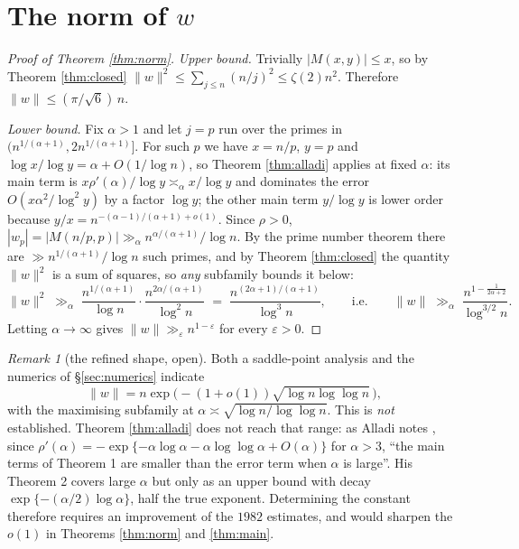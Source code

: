 \documentclass[11pt]{article}
\theoremstyle{definition}
\theoremstyle{remark}
\newtheorem{remark}[theorem]{Remark}
\begin{document}
\section{The norm of \texorpdfstring{$w$}{w}}\label{sec:norm}

\begin{proof}[Proof of Theorem \ref{thm:norm}]
\emph{Upper bound.} Trivially $|M(x,y)|\le x$, so by Theorem \ref{thm:closed}
$\|w\|^2\le\sum_{j\le n}(n/j)^2\le\zeta(2)n^2$. Therefore
$\|w\|\le (\pi/\sqrt6)\,n$.

\emph{Lower bound.} Fix $\alpha>1$ and let $j=p$ run over the primes in
$(n^{1/(\alpha+1)},2n^{1/(\alpha+1)}]$. For such $p$ we have $x=n/p$, $y=p$ and
$\log x/\log y=\alpha+O(1/\log n)$, so Theorem \ref{thm:alladi} applies at fixed
$\alpha$: its main term is $x\rho'(\alpha)/\log y\asymp_\alpha x/\log y$ and
dominates the error $O(x\alpha^2/\log^2 y)$ by a factor $\log y$; the other
main term $y/\log y$ is lower order because
$y/x=n^{-(\alpha-1)/(\alpha+1)+o(1)}$. Since
$\rho>0$, $|w_p| = |M(n/p,p)| \gg_\alpha n^{\alpha/(\alpha+1)}/\log n$. By the
prime number theorem there are $\gg n^{1/(\alpha+1)}/\log n$ such primes, and by
Theorem \ref{thm:closed} the quantity $\|w\|^2$ is a sum of squares, so
\emph{any} subfamily bounds it below:
\[
  \|w\|^2 \;\gg_\alpha\; \frac{n^{1/(\alpha+1)}}{\log n}\cdot
  \frac{n^{2\alpha/(\alpha+1)}}{\log^2 n}
  \;=\;\frac{n^{(2\alpha+1)/(\alpha+1)}}{\log^3 n},
  \qquad\text{i.e.}\qquad
  \|w\| \;\gg_\alpha\; \frac{n^{1-\frac1{2\alpha+2}}}{\log^{3/2} n}.
\]
Letting $\alpha\to\infty$ gives $\|w\|\gg_\varepsilon n^{1-\varepsilon}$ for every
$\varepsilon>0$.
\end{proof}

\begin{remark}[the refined shape, open]\label{rem:shape}
Both a saddle-point analysis and the numerics of \S\ref{sec:numerics} indicate
\[
 \|w\| = n\exp\bigl(-(1+o(1))\sqrt{\log n\log\log n}\,\bigr),
\]
with the maximising subfamily at
$\alpha\asymp\sqrt{\log n/\log\log n}$. This is \emph{not}
established. Theorem \ref{thm:alladi} does not reach that range: as Alladi notes
\cite[p.~87]{alladiJNT}, since $\rho'(\alpha)=-\exp\{-\alpha\log\alpha-\alpha\log\log\alpha+O(\alpha)\}$
for $\alpha>3$, ``the main terms of Theorem 1 are smaller than the error term when
$\alpha$ is large''. His Theorem 2 covers large $\alpha$ but only as an upper bound
with decay $\exp\{-(\alpha/2)\log\alpha\}$, half the true exponent. Determining
the constant therefore requires an improvement of the $1982$ estimates, and would
sharpen the $o(1)$ in Theorems \ref{thm:norm} and \ref{thm:main}.
\end{remark}
\end{document}
